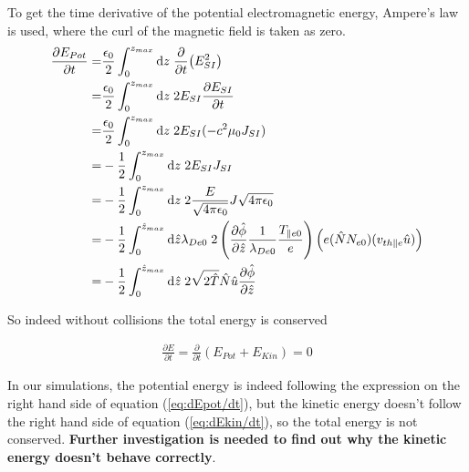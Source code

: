 \documentclass[final]{jpp}
\begin{document}
To get the time derivative of the potential electromagnetic energy, Ampere's law is used, where the curl of the magnetic field is taken as zero.
\begin{align}
    \frac{\partial E_{Pot}}{\partial t} =& \frac{\epsilon_0}{2}\int_0^{z_{max}} {\rm d}z \;\frac{\partial}{\partial t}\big(E_{SI}^2\big) \nonumber \\
    =& \frac{\epsilon_0}{2}\int_0^{z_{max}} {\rm d}z \;2E_{SI}\frac{\partial E_{SI}}{\partial t} \nonumber \\
    =& \frac{\epsilon_0}{2}\int_0^{z_{max}} {\rm d}z \;2E_{SI}(-c^2\mu_0J_{SI}) \nonumber \\
    =& -\frac{1}{2}\int_0^{z_{max}} {\rm d}z \;2E_{SI}J_{SI} \nonumber \\
    =& -\frac{1}{2}\int_0^{z_{max}} {\rm d}z \;2\frac{E}{\sqrt{4\pi\epsilon_0}}J\sqrt{4\pi\epsilon_0} \nonumber \\
    =& -\frac{1}{2}\int_0^{\hat{z}_{max}} {\rm d}\hat{z}\lambda_{De0} \;2\left(\frac{\partial \hat{\phi}}{\partial \hat{z}} \frac{1}{\lambda_{De0}} \frac{T_{\parallel e0}}{e} \right) \left( e(\hat{N}N_{e0}) (v_{th\parallel e} \hat{u}) \right) \nonumber \\
    =& -\frac{1}{2}\int_0^{\hat{z}_{max}} {\rm d}\hat{z}\;     2\sqrt{2\hat{T}}\hat{N}\hat{u}  \frac{\partial \hat{\phi}}{\partial \hat{z} }   \label{eq:dEpot/dt}
\end{align}

So indeed without collisions the total energy is conserved 

\begin{align}
    \frac{\partial E}{\partial t} = \frac{\partial}{\partial t}(E_{Pot}+E_{Kin}) = 0
\end{align}

In our simulations, the potential energy is indeed following the expression on the right hand side of equation (\ref{eq:dEpot/dt}), but the kinetic energy doesn't follow the right hand side of equation (\ref{eq:dEkin/dt}), so the total energy is not conserved. \textbf{Further investigation is needed to find out why the kinetic energy doesn't behave correctly}.




\end{document}
